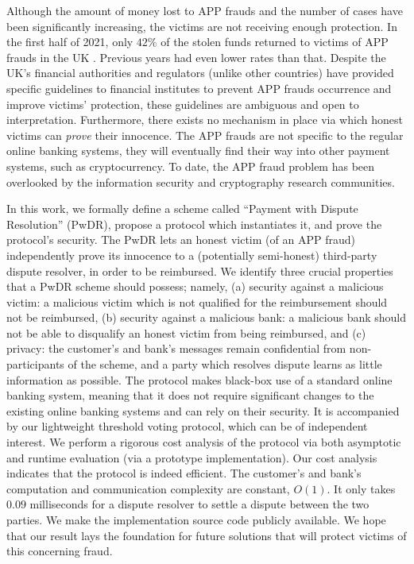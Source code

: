 Although the amount of money lost to  APP frauds and the number of cases have been significantly  increasing, the victims are not receiving  enough protection.  In the first half of 2021, only $42\%$ of the stolen funds returned to victims of  APP frauds in the UK \cite{2021-Half-Year-Fraud-Update}. Previous years had even lower rates than that. Despite  the UK's financial authorities and regulators (unlike other countries) have provided specific guidelines to financial institutes to prevent  APP frauds occurrence and improve victims' protection, these guidelines are  ambiguous and    open to interpretation. Furthermore,  there exists  no  mechanism in place via which honest victims can  \emph{prove} their innocence. The APP frauds are not specific to the regular online banking systems, they will eventually find their way into other payment systems, such as cryptocurrency. To date, the APP fraud problem has been overlooked by the information security and cryptography research communities.


In this work, we formally define a scheme called ``Payment with Dispute Resolution'' (PwDR),  propose a protocol which instantiates it, and  prove the protocol's security.  The PwDR lets an honest victim (of an APP fraud)  independently prove its innocence to a  (potentially semi-honest) third-party dispute resolver, in order to be reimbursed.  We identify three crucial properties that a PwDR scheme should possess; namely, (a) security against a malicious victim: a malicious victim  which is not qualified for the reimbursement should not be reimbursed, (b) security against a malicious bank: a malicious bank should not be able to disqualify an honest victim  from being reimbursed, and (c) privacy: the customer’s and bank’s messages remain confidential from non-participants of the scheme, and a party which resolves dispute  learns as little information as possible.  The  protocol makes black-box use of a standard  online banking system, meaning that it does not require significant changes to the existing online banking systems and can rely on their security. It is accompanied by our lightweight threshold voting protocol, which can be of independent interest. We perform a rigorous cost analysis of the protocol via both asymptotic and runtime  evaluation (via a prototype implementation). Our cost analysis indicates that the protocol is indeed efficient. The customer's and bank's computation and communication complexity are constant, $O(1)$. It only takes $0.09$ milliseconds for a dispute resolver to settle a dispute between the two parties. We  make  the implementation source code publicly available. We hope that our result lays the foundation for future solutions that will protect victims of this concerning  fraud. 




